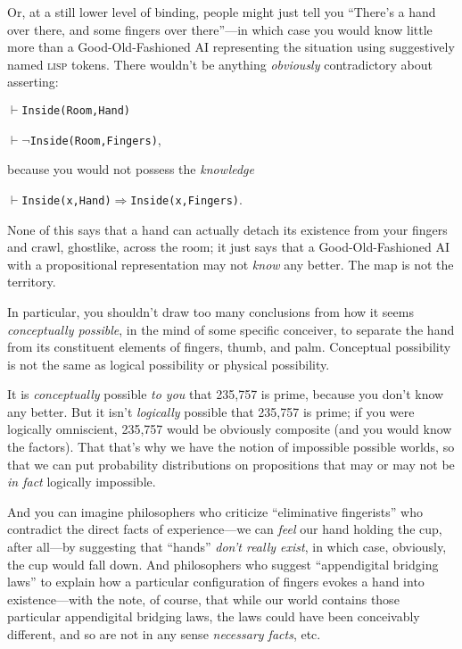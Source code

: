 {
 Or, at a still lower level of binding, people might just tell you
``There's a hand over there, and some
fingers over there''---in which case you would know
little more than a Good-Old-Fashioned AI representing the situation
using suggestively named \textsc{lisp} tokens. There wouldn't be
anything \textit{obviously} contradictory about asserting:}


$\vdash$\texttt{Inside(Room,Hand)}

$\vdash\lnot$\texttt{Inside(Room,Fingers)},

{
 because you would not possess the \textit{knowledge}}

 $\vdash$\texttt{Inside(x,Hand)$\Rightarrow $Inside(x,Fingers)}.

{
 None of this says that a hand can actually detach its existence
from your fingers and crawl, ghostlike, across the room; it just says
that a Good-Old-Fashioned AI with a propositional representation may
not \textit{know} any better. The map is not the territory.}

{
 In particular, you shouldn't draw too many
conclusions from how it seems \textit{conceptually possible}, in the
mind of some specific conceiver, to separate the hand from its
constituent elements of fingers, thumb, and palm. Conceptual
possibility is not the same as logical possibility or physical
possibility.}

{
 It is \textit{conceptually} possible \textit{to you} that 235,757
is prime, because you don't know any better. But it
isn't \textit{logically} possible that 235,757 is
prime; if you were logically omniscient, 235,757 would be obviously
composite (and you would know the factors). That that's
why we have the notion of impossible possible worlds, so that we can
put probability distributions on propositions that may or may not be
\textit{in fact} logically impossible.}

{
 And you can imagine philosophers who criticize
``eliminative fingerists'' who
contradict the direct facts of experience---we can \textit{feel} our
hand holding the cup, after all---by suggesting that
``hands''
\textit{don't really exist}, in which case, obviously,
the cup would fall down. And philosophers who suggest
``appendigital bridging laws'' to
explain how a particular configuration of fingers evokes a hand into
existence---with the note, of course, that while our world contains
those particular appendigital bridging laws, the laws could have been
conceivably different, and so are not in any sense \textit{necessary
facts}, etc.}

